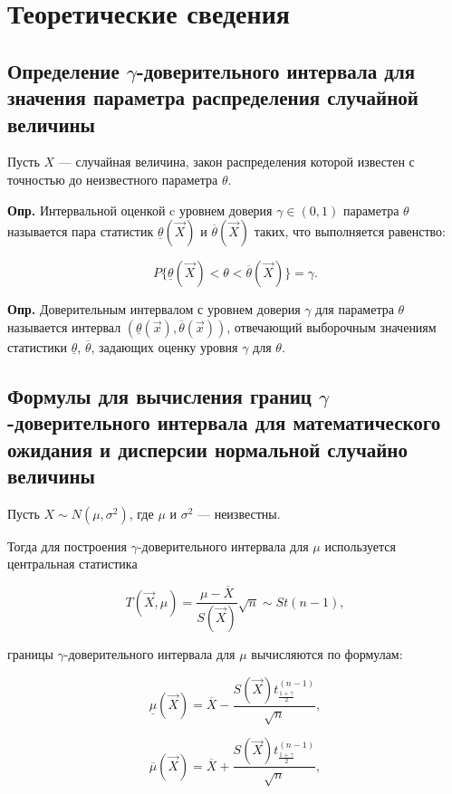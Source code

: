 \chapter{Теоретические сведения}

\section{Определение $\gamma$-доверительного интервала для значения параметра распределения случайной величины}

Пусть $X$ --- случайная величина, закон распределения которой известен с
точностью до неизвестного параметра $\theta$.

\textbf{Опр.} Интервальной оценкой c уровнем доверия $\gamma \in (0, 1)$ параметра $\theta$ называется пара статистик $\underline \theta (\vec X)$ и $\overline \theta (\vec X)$ таких, что выполняется равенство:

$$ 
	 P\{ \underline \theta (\vec X) < \theta  < \overline \theta (\vec X)\} = \gamma.
$$

\textbf{Опр.} Доверительным интервалом с уровнем доверия $\gamma$ для параметра $\theta$ называется интервал $(\underline \theta (\vec x), \overline \theta (\vec x))$, отвечающий выборочным значениям статистики $\underline \theta$, $\overline \theta$, задающих оценку уровня $\gamma$ для $\theta$.

\section{Формулы для вычисления границ $\gamma$-доверительного интервала для математического ожидания и дисперсии нормальной случайно величины}

Пусть $X \sim N(\mu, \sigma^2)$, где $\mu$ и $\sigma^2$ --- неизвестны.

Тогда для построения $\gamma$-доверительного интервала для $\mu$ используется
центральная статистика

$$
	\label{eq:T_1}
	T(\vec X, \mu) = \frac{\mu - \overline X}{S(\vec X)} \sqrt n \sim St(n - 1),
$$

 границы $\gamma$-доверительного интервала для $\mu$ вычисляются по
формулам:

$$
	\label{eq:mu_lower}
	\underline \mu (\vec X) = \overline X - \frac{S(\vec X)t^{(n-1)}_{\frac{1 +
				\gamma}{2}}}{\sqrt n},
$$

$$
	\label{eq:mu_upper}
	\overline \mu (\vec X) = \overline X + \frac{S(\vec X)t^{(n-1)}_{\frac{1 +
				\gamma}{2}}}{\sqrt n},
$$


